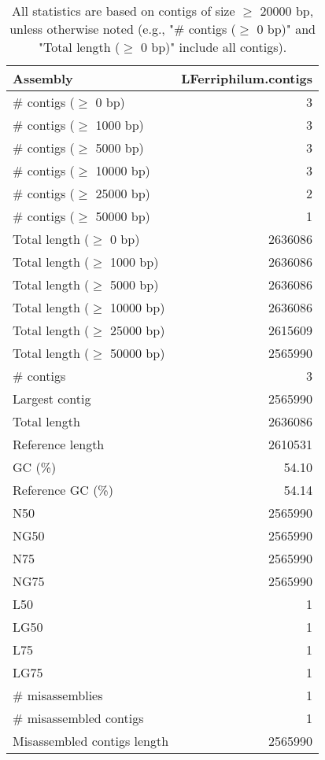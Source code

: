 \documentclass[12pt,a4paper]{article}
\begin{document}
\begin{table}[ht]
\begin{center}
\caption{All statistics are based on contigs of size $\geq$ 20000 bp, unless otherwise noted (e.g., "\# contigs ($\geq$ 0 bp)" and "Total length ($\geq$ 0 bp)" include all contigs).}
\begin{tabular}{|l*{1}{|r}|}
\hline
Assembly & LFerriphilum.contigs \\ \hline
\# contigs ($\geq$ 0 bp) & 3 \\ \hline
\# contigs ($\geq$ 1000 bp) & 3 \\ \hline
\# contigs ($\geq$ 5000 bp) & 3 \\ \hline
\# contigs ($\geq$ 10000 bp) & 3 \\ \hline
\# contigs ($\geq$ 25000 bp) & 2 \\ \hline
\# contigs ($\geq$ 50000 bp) & 1 \\ \hline
Total length ($\geq$ 0 bp) & 2636086 \\ \hline
Total length ($\geq$ 1000 bp) & 2636086 \\ \hline
Total length ($\geq$ 5000 bp) & 2636086 \\ \hline
Total length ($\geq$ 10000 bp) & 2636086 \\ \hline
Total length ($\geq$ 25000 bp) & 2615609 \\ \hline
Total length ($\geq$ 50000 bp) & 2565990 \\ \hline
\# contigs & 3 \\ \hline
Largest contig & 2565990 \\ \hline
Total length & 2636086 \\ \hline
Reference length & 2610531 \\ \hline
GC (\%) & 54.10 \\ \hline
Reference GC (\%) & 54.14 \\ \hline
N50 & 2565990 \\ \hline
NG50 & 2565990 \\ \hline
N75 & 2565990 \\ \hline
NG75 & 2565990 \\ \hline
L50 & 1 \\ \hline
LG50 & 1 \\ \hline
L75 & 1 \\ \hline
LG75 & 1 \\ \hline
\# misassemblies & 1 \\ \hline
\# misassembled contigs & 1 \\ \hline
Misassembled contigs length & 2565990 \\ \hline

\end{tabular}
\end{center}
\end{table}
\end{document}
